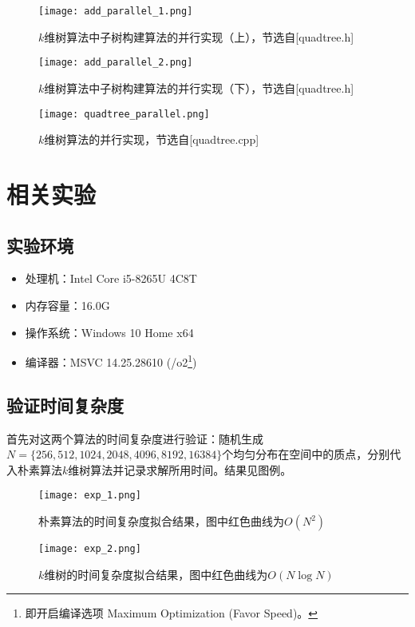 \documentclass[lang=cn,11pt,a4paper,cite=authoryear]{elegantpaper}
\begin{document}
\begin{figure}[htbp]
  \centering
  \texttt{[image: add\_parallel\_1.png]}
  \caption{$k$维树算法中子树构建算法的并行实现（上），节选自[quadtree.h]}
\end{figure}

\begin{figure}[htbp]
  \centering
  \texttt{[image: add\_parallel\_2.png]}
  \caption{$k$维树算法中子树构建算法的并行实现（下），节选自[quadtree.h]}
\end{figure}

\begin{figure}[htbp]
  \centering
  \texttt{[image: quadtree\_parallel.png]}
  \caption{$k$维树算法的并行实现，节选自[quadtree.cpp]}
\end{figure}

\newpage

\section{相关实验}

\subsection{实验环境}
\begin{itemize}
\item 处理机：Intel Core i5-8265U 4C8T
\item 内存容量：16.0G
\item 操作系统：Windows 10 Home x64
\item 编译器：MSVC 14.25.28610 (/o2\footnote{即开启编译选项 Maximum Optimization (Favor Speed)。})
\end{itemize}

\subsection{验证时间复杂度}

首先对这两个算法的时间复杂度进行验证：随机生成$N=\{256,512,1024,2048,4096,8192,16384\}$个均匀分布在空间中的质点，分别代入朴素算法$k$维树算法并记录求解所用时间。结果见图例。

\begin{figure}[htbp]
  \centering
  \texttt{[image: exp\_1.png]}
  \caption{朴素算法的时间复杂度拟合结果，图中红色曲线为$O(N^2)$}
\end{figure}

\begin{figure}[htbp]
  \centering
  \texttt{[image: exp\_2.png]}
  \caption{$k$维树的时间复杂度拟合结果，图中红色曲线为$O(N\log N)$}
\end{figure}
\end{document}
